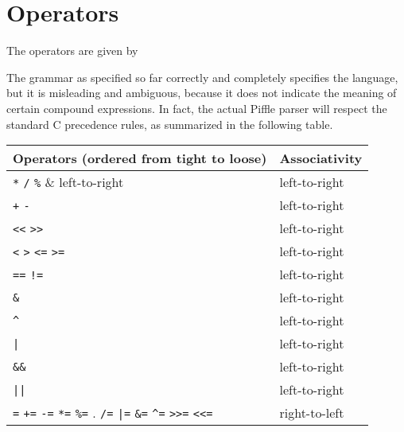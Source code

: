 \documentclass[a4paper,12pt]{scrreprt}
\begin{document}
\section{Operators}

The operators are given by

The grammar as specified so far correctly and completely specifies the
language, but it is misleading and ambiguous, because it does not
indicate the meaning of certain compound expressions. In fact, the
actual Piffle parser will respect the standard C precedence rules, as
summarized in the following table.

\def\x{\phantom{x}}
\vspace{1em}
\begin{tabular}{ll}
\hline\hline
Operators (ordered from tight to loose) & Associativity\\
\hline
\verb.*. \x \verb./. \x \verb.%. & left-to-right \\
\verb.+. \x \verb.-. & left-to-right \\
\verb.<<. \x \verb.>>. & left-to-right \\
\verb.<. \x \verb.>. \x \verb.<=. \x \verb.>=. & left-to-right \\
\verb.==. \x \verb.!=. & left-to-right \\
\verb.&. & left-to-right \\
\verb.^. & left-to-right \\
\verb.|. & left-to-right \\
\verb.&&. & left-to-right \\
\verb.||. & left-to-right \\
\verb.=. \x \verb.+=. \x \verb.-=. \x \verb.*=. \x \verb.%=. \x
\verb./=. \x \verb.|=. \x \verb.&=. \x \verb.^=. \x
\verb.>>=. \x \verb.<<=. & right-to-left\\
\hline\hline
\end{tabular}
\vspace{1em}
\end{document}
